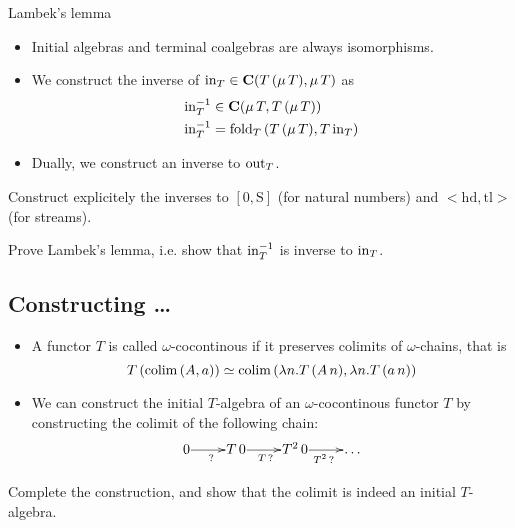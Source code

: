 \documentclass[handout]{beamer}
\begin{document}
\begin{frame}{Lambek's lemma}

  \begin{itemize}
  \item Initial algebras and terminal coalgebras are always isomorphisms.

  \item We construct the inverse of $\mathrm{in}_T\in \mathbf{C}(T\,(\mu\,T),\mu\,T)$ as 
    \begin{align*}
      & \mathrm{in}_T^{-1} \in \mathbf{C}(\mu\,T,T\,(\mu\,T))\\
      & \mathrm{in}_T^{-1} = \mathrm{fold}_T\,(T\,(\mu\,T), T\,\mathrm{in}_T)
    \end{align*}

  \item Dually, we construct an inverse to $\mathrm{out}_T$.
  \end{itemize}

  \begin{exercise}
    Construct explicitely the inverses to $[0,\mathrm{S}]$ (for natural numbers) and
    $<\mathrm{hd},\mathrm{tl}>$ (for streams).
  \end{exercise}

  \begin{exercise}
    Prove Lambek's lemma, i.e. show that $\mathrm{in}_T^{-1}$ is inverse to
    $\mathrm{in}_T$.
  \end{exercise}
  
\end{frame}

\subsection{Constructing \dots}


\begin{frame}
  \begin{itemize}
 
  \item A functor $T$ is called $\omega$-cocontinous if it preserves
    colimits of $\omega$-chains, that is
    \[ T\,(\mathrm{colim}\,(A,a)) \simeq \mathrm{colim}\,(\lambda n.T\,(A\,n),\lambda n.T\,(a\, n)) \]

  \item We can construct the initial $T$-algebra of an $\omega$-cocontinous functor $T$ by constructing the colimit of the following 
    chain:
    \[ \xymatrix@1{ 0 \ar[r]_{?} & T\,0 \ar[r]_{T\,?} & T^2\,0 \ar[r]_{T^2\,?} & \dots} \]
 
  \end{itemize}

  \begin{exercise}
    Complete the construction, and show that the colimit is indeed an initial $T$-algebra.
  \end{exercise}



\end{frame}
\end{document}
